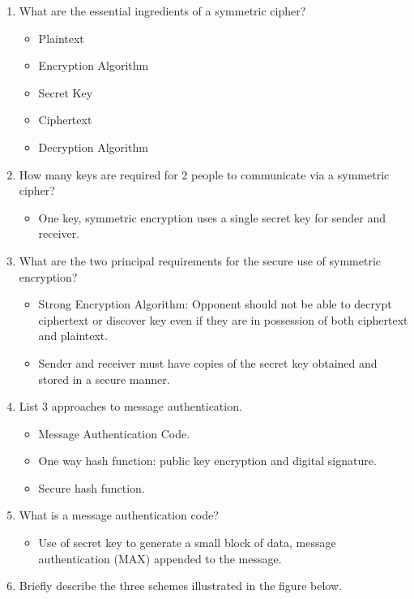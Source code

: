 \documentclass[12pt]{article}
\begin{document}
	\begin{enumerate}[label=Q2.\arabic*]
		\item What are the essential ingredients of a symmetric cipher?
			\begin{itemize}
				\item Plaintext
				\item Encryption Algorithm
				\item Secret Key
				\item Ciphertext
				\item Decryption Algorithm
			\end{itemize}
		\item How many keys are required for 2 people to communicate via a symmetric cipher?
			\begin{itemize}
				\item One key, symmetric encryption uses a single secret key for sender and receiver.
			\end{itemize}
		\item What are the two principal requirements for the secure use of symmetric encryption?
			\begin{itemize}
				\item Strong Encryption Algorithm: Opponent should not be able to decrypt ciphertext or discover key even if they are in possession of both ciphertext and plaintext.
				\item Sender and receiver must have copies of the secret key obtained and stored in a secure manner.
			\end{itemize}
		\item List 3 approaches to message authentication.
			\begin{itemize}
				\item Message Authentication Code.
				\item One way hash function: public key encryption and digital signature.
				\item Secure hash function.
			\end{itemize}
		\item What is a message authentication code?
			\begin{itemize}
				\item  Use of secret key to generate a small block of data, message authentication (MAX) appended to the message.
			\end{itemize}
		\item Briefly describe the three schemes illustrated in the figure below.
			\begin{itemize}

\end{itemize}
\end{enumerate}
\end{document}
